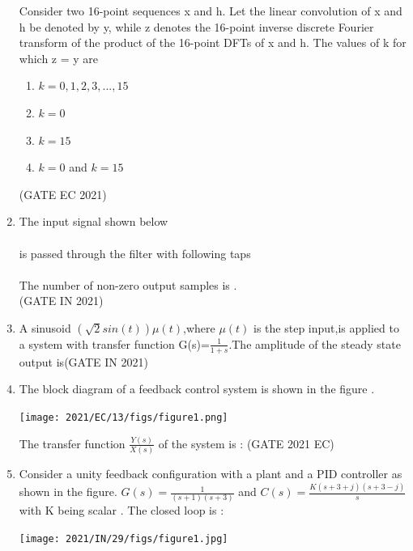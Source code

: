 \begin{enumerate}[label=\thechapter.\arabic*,ref=\thechapter.\theenumi]
Consider two 16-point sequences x and h. Let the linear convolution of x and h be denoted by y, while z denotes the 16-point inverse discrete Fourier transform  of the product of the 16-point DFTs of x and h. The values of k for which z = y are 
\begin{enumerate}
    \item $k = 0, 1, 2, 3, ... , 15$
    \item $k = 0$
    \item $k = 15$
    \item $k = 0$ and $k = 15$
\end{enumerate}
\hfill(GATE EC 2021)\\
\solution

\pagebreak
\item The input signal shown below \\
\\
is passed through the filter with following taps\\
\\
The number of non-zero output samples is \underline{\hspace{1cm}}.\\
\hfill(GATE IN 2021)
\solution

\pagebreak
\item A sinusoid $(\sqrt{2}sin(t))\mu(t)$,where $\mu(t)$ is the step input,is applied to a system with transfer function G(s)=$\frac{1}{1+s}$.The amplitude of the steady state output is\hfill{(GATE IN 2021)}\\
\solution

\pagebreak
\item The block diagram of a feedback control system is shown in the figure .
\begin{center}
\texttt{[image: 2021/EC/13/figs/figure1.png]}
\end{center}
The transfer function $\frac{Y(s)}{X(s)}$ of the system is :
\hfill(GATE 2021 EC)\\
\solution

\pagebreak
\item Consider a unity feedback configuration with a plant and a PID controller as shown in the figure. $G(s) = \frac{1}{(s+1)(s+3)} $ and $ C(s) = \frac{K(s+3+j)(s+3-j)}{s}$ with K being scalar . The closed loop is :
\begin{center}
\texttt{[image: 2021/IN/29/figs/figure1.jpg]}
\end{center}

\end{enumerate}
